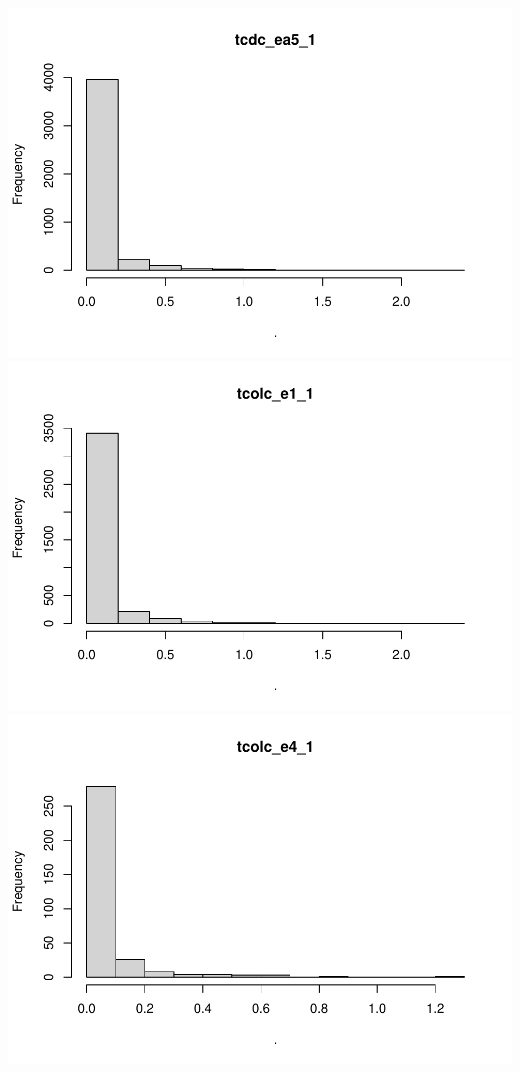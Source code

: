 \documentclass[
  11pt,
  a4paper,
]{article}
\begin{document}
\includegraphics{memoria_practica_1_files/figure-latex/unnamed-chunk-6-4.pdf}
\includegraphics{memoria_practica_1_files/figure-latex/unnamed-chunk-6-5.pdf}
\includegraphics{memoria_practica_1_files/figure-latex/unnamed-chunk-6-6.pdf}
\end{document}
